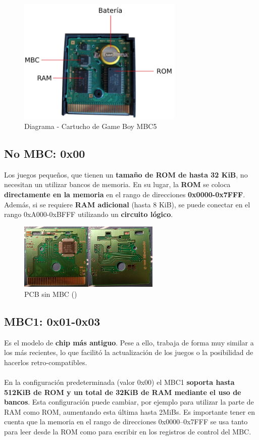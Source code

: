 \begin{figure}[H]
    \centering
    \includegraphics[width=0.7\textwidth]{include/images/cart.png}
    \caption{Diagrama - Cartucho de Game Boy MBC5}
    \label{figure:cart_gameboy}
\end{figure}

\subsection{No MBC: 0x00} Los juegos pequeños, que tienen un \textbf{tamaño de ROM de hasta 32 KiB}, no necesitan un utilizar bancos de memoria. En su lugar, la \textbf{ROM} se coloca \textbf{directamente en la memoria} en el rango de direcciones \textbf{0x0000-0x7FFF}. Además, si se requiere \textbf{RAM adicional} (hasta 8 KiB), se puede conectar en el rango 0xA000-0xBFFF utilizando un \textbf{circuito lógico}.

\begin{figure}[H]
    \centering
    \includegraphics[width=0.6\textwidth]{include/images/nombc.jpg}
    \caption{PCB sin MBC (\cite{hardwaredatabase})}
    \label{figure:cart_no_mbc}
\end{figure}

\subsection{MBC1: 0x01-0x03} Es el modelo de \textbf{chip más antiguo}. Pese a ello, trabaja de forma muy similar a los más recientes, lo que facilitó la actualización de los juegos o la posibilidad de hacerlos retro-compatibles.
\\\\
En la configuración predeterminada (valor 0x00) el MBC1 \textbf{soporta hasta 512KiB de ROM y un total de 32KiB de RAM mediante el uso de bancos}. Esta configuración puede cambiar, por ejemplo para utilizar la parte de RAM como ROM, aumentando esta última hasta 2MiBs. Es importante tener en cuenta que la memoria en el rango de direcciones 0x0000–0x7FFF se usa tanto para leer desde la ROM como para escribir en los registros de control del MBC.

